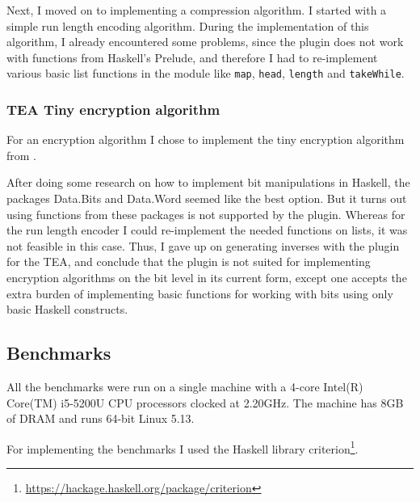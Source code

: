 \documentclass[12pt,a4paper, dvipsnames,usenames]{article}
\begin{document}
Next, I moved on to implementing a compression algorithm. I started with
a simple run length encoding algorithm.
During the implementation of this algorithm, I already encountered  some problems,
since the plugin does not work with functions from Haskell's Prelude, and therefore
I had to re-implement various basic list functions in the module like
\texttt{map}, \texttt{head}, \texttt{length} and \texttt{takeWhile}.

\subsubsection{TEA Tiny encryption algorithm}

For an encryption algorithm I chose to implement the
tiny encryption algorithm from \cite{wheeler1995tea}.

After doing some research on how to implement bit manipulations in Haskell, the
packages Data.Bits and Data.Word seemed like the best option.
But it turns out using functions from these packages is not supported
by the plugin.
Whereas for the run length encoder I could re-implement the needed functions on
lists, it was not feasible in this case. Thus, I gave up on generating
inverses with the plugin for the TEA, and
conclude that the plugin is not suited for implementing encryption algorithms
on the bit level in its current form,
except one accepts the extra burden of implementing
basic functions for working with bits using only basic Haskell constructs.

\subsection{Benchmarks}

All the benchmarks were run on a single machine
with a 4-core Intel(R) Core(TM) i5-5200U CPU
processors clocked at 2.20GHz.
The machine has 8GB of DRAM and runs 64-bit Linux 5.13.

For implementing the benchmarks I used the Haskell library
criterion\footnote{\href{https://hackage.haskell.org/package/criterion}{https://hackage.haskell.org/package/criterion}}.
\end{document}
